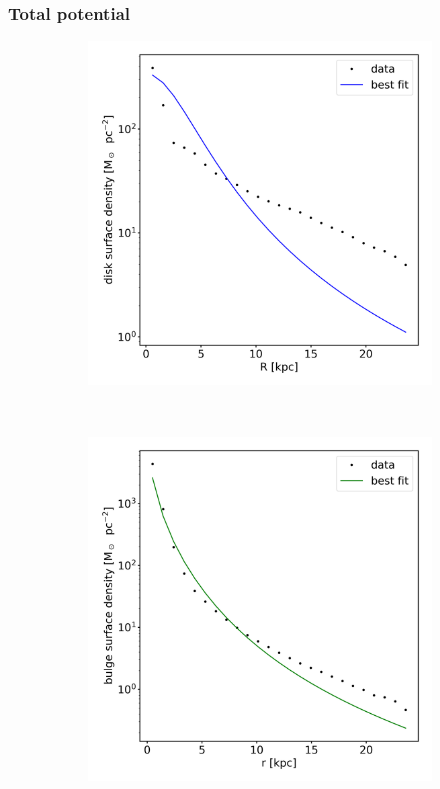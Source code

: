 \subsubsection{Total potential}
\begin{figure}
    \centering
    \begin{subfigure}[b]{0.3\textwidth}
	    \includegraphics[width=\textwidth]{plots/Auriga/surface_dens_disk_fit_data.png}
	    \label{fig:disk_surfdens_fit}
    \end{subfigure}
    ~ %
    \begin{subfigure}[b]{0.3\textwidth}
    \centering
    	\includegraphics[width=\textwidth]{plots/Auriga/surface_dens_spher_fit_data.png}

\end{subfigure}
\end{figure}
